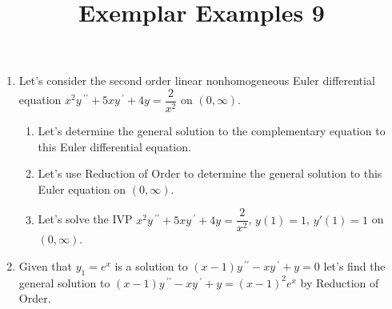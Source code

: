 \documentclass{ximera}
\begin{document}
\begin{abstract}
 \end{abstract}

    \title{Exemplar Examples 9}
    
    \maketitle


\begin{enumerate}

\item Let's consider the second order linear nonhomogeneous Euler differential equation $x^2y\,^{\prime\prime}+5xy\,^{\prime}+4y=\dfrac{2}{x^2}$ on $(0,\infty)$.


\begin{enumerate}

\item Let's determine the general solution to the complementary equation to this Euler differential equation.


\vfill



\item Let's use Reduction of Order to determine the general solution to this Euler equation on $(0,\infty)$.



\vfill


\vfill

\newpage

\item Let's solve the IVP $x^2y\,^{\prime\prime}+5xy\,^{\prime}+4y=\dfrac{2}{x^2}$, $y(1)=1$, $y'(1)=1$ on $(0,\infty)$.



\vfill

\end{enumerate}


\item Given that $y_1=e^x$ is a solution to $(x-1)y\,^{\prime\prime}-x y\,^{\prime}+y=0$ let's find the general solution to $(x-1)y\,^{\prime\prime}-x y\,^{\prime}+y=(x-1)^2e^{x}$ by Reduction of Order.

\vfill
\vfill







\end{enumerate}
\end{document}
